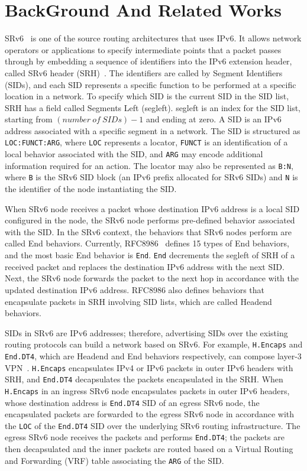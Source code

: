 \chapter{BackGround And Related Works}
\label{chap:related_works}
SRv6~\cite{rfc8986} is one of the source routing architectures that uses IPv6.
It allows network operators or applications to specify intermediate points that a packet passes through by embedding a sequence of identifiers into the IPv6 extension header, called SRv6 header (SRH)~\cite{rfc8754}.
The identifiers are called by Segment Identifiers (SIDs), and each SID represents a specific function to be performed at a specific location in a network.  To specify which SID is the current SID in the SID list, SRH has a field called Segments Left (segleft).
segleft is an index for the SID list, starting from $(number\ of\ SIDs)-1$ and ending at zero.
A SID is an IPv6 address associated with a specific segment in a network.
The SID is structured as \texttt{LOC:FUNCT:ARG}, where \texttt{LOC} represents a locator, \texttt{FUNCT} is an identification of a local behavior associated with the SID, and \texttt{ARG} may encode additional information required for an action.
The locator may also be represented as \texttt{B:N}, where \texttt{B} is the SRv6 SID block (an IPv6 prefix allocated for SRv6 SIDs) and \texttt{N} is the identifier of the node instantiating the SID.

When SRv6 node receives a packet whose destination IPv6 address is a local SID configured in the node, the SRv6 node performs pre-defined behavior associated with the SID.
In the SRv6 context, the behaviors that SRv6 nodes perform are called End behaviors.
Currently, RFC8986~\cite{rfc8986} defines 15 types of End behaviors, and the most basic End behavior is \texttt{End}. %
\texttt{End} decrements the segleft of SRH of a received packet and replaces the destination IPv6 address with the next SID.
Next, the SRv6 node forwards the packet to the next hop in accordance with the updated destination IPv6 address.
RFC8986 also defines behaviors that encapsulate packets in SRH involving SID lists, which are called Headend behaviors.

SIDs in SRv6 are IPv6 addresses; therefore, advertising SIDs over the existing routing protocols can build a network based on SRv6.
For example, \texttt{H.Encaps} and \texttt{End.DT4}, which are Headend and End behaviors respectively, can compose layer-3 VPN~\cite{rfc9252}.
\texttt{H.Encaps} encapsulates IPv4 or IPv6 packets in outer IPv6 headers with SRH, and \texttt{End.DT4} decapsulates the packets encapsulated in the SRH.
When \texttt{H.Encaps} in an ingress SRv6 node encapsulates packets in outer IPv6 headers, whose destination address is \texttt{End.DT4} SID of an egress SRv6 node, the encapsulated packets are forwarded to the egress SRv6 node in accordance with the \texttt{LOC} of the \texttt{End.DT4} SID over the underlying SRv6 routing infrastructure.
The egress SRv6 node receives the packets and performs \texttt{End.DT4}; the packets are then decapsulated and the inner packets are routed based on a Virtual Routing and Forwarding (VRF) table associating the \texttt{ARG} of the SID.


